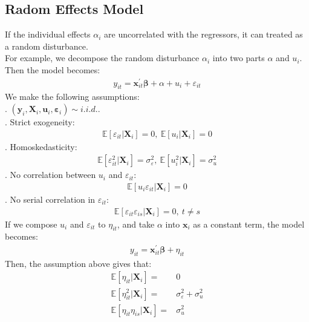 \documentclass{article}
\begin{document}
\subsection{Radom Effects Model}
If the individual effects $\alpha_i$ are uncorrelated with the regressors, it can treated as a random disturbance.\\
For example, we decompose the random disturbance $\alpha_i$ into two parts $\alpha$ and $u_i$. Then the model becomes:
	\begin{align*}
		y_{it} = \boldsymbol{x}^\prime_{it} \boldsymbol{\beta} + \alpha + u_{i} + \varepsilon_{it}
	\end{align*}
We make the following assumptions:\\
. $(\boldsymbol{y}_i, \boldsymbol{X}_i, \boldsymbol{u}_i, \boldsymbol{\varepsilon}_i) \sim i.i.d.$.\\
. Strict exogeneity:
	\begin{align*}
		\mathbb{E} [\varepsilon_{it} | \boldsymbol{X}_i] = 0,\ \mathbb{E} [u_i | \boldsymbol{X}_i] = 0
	\end{align*}
. Homoskedasticity:
	\begin{align*}
		\mathbb{E} [\varepsilon^2_{it} | \boldsymbol{X}_i] = \sigma^2_\varepsilon,\ \mathbb{E} [u^2_i | \boldsymbol{X}_i] = \sigma^2_u
	\end{align*}
. No correlation between $u_i$ and $\varepsilon_{it}$:
	\begin{align*}
		\mathbb{E} [u_i \varepsilon_{it} | \boldsymbol{X}_i] = 0
	\end{align*}
. No serial correlation in $\varepsilon_{it}$:
	\begin{align*}
		\mathbb{E} [\varepsilon_{it} \varepsilon_{is} | \boldsymbol{X}_i] = 0,\ t \neq s
	\end{align*}
If we compose $u_i$ and $\varepsilon_{it}$ to $\eta_{it}$, and take $\alpha$ into $\boldsymbol{x}_i$ as a constant term, the model becomes:
	\begin{align*}
		y_{it} = \boldsymbol{x}^\prime_{it} \boldsymbol{\beta} + \eta_{it}
	\end{align*}
Then, the assumption above gives that:
	\begin{align*}
		\mathbb{E} [\eta_{it} | \boldsymbol{X}_i] = & 0\\
		\mathbb{E} [\eta^2_{it} | \boldsymbol{X}_i] = & \sigma^2_\varepsilon + \sigma^2_u\\
		\mathbb{E} [\eta_{it} \eta_{is} | \boldsymbol{X}_i] = & \sigma^2_u
	\end{align*}
\end{document}
